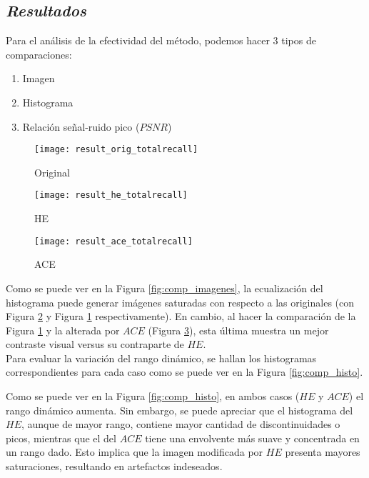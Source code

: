 \subsection{\emph{Resultados}}

Para el análisis de la efectividad del método, podemos hacer 3 tipos de
comparaciones:
\begin{enumerate}
	\item Imagen
	\item Histograma
	\item Relación señal-ruido pico ($PSNR$)
\end{enumerate}

\begin{figure*}%
	\centering
		\begin{subfigure}{1.0\columnwidth}
		\texttt{[image: result\_orig\_totalrecall]}%
		\caption{Original}%
		\label{subfig:original}%
	\end{subfigure}\hfill%
	\begin{subfigure}{1.0\columnwidth}
		\texttt{[image: result\_he\_totalrecall]}%
		\caption{HE}%
		\label{subfig:he}%
	\end{subfigure}\hfill%
	\begin{subfigure}{1.0\columnwidth}
		\texttt{[image: result\_ace\_totalrecall]}%
		\caption{ACE}%
		\label{subfig:ace}%
	\end{subfigure}%
	\caption{Comparación de resultados para la imagen de prueba \emph{Total Recall}.}
	\label{fig:comp_imagenes}
\end{figure*}

Como se puede ver en la Figura \ref{fig:comp_imagenes}, la ecualización del
histograma puede generar imágenes saturadas con respecto a las originales
(con Figura \ref{subfig:he} y Figura \ref{subfig:original} respectivamente). En
cambio, al hacer la comparación de la Figura \ref{subfig:original} y la alterada
por $ACE$ (Figura \ref{subfig:ace}), esta última muestra un mejor contraste
visual versus su contraparte de $HE$.\\

Para evaluar la variación del rango dinámico, se hallan los histogramas
correspondientes para cada caso como se puede ver en la Figura
\ref{fig:comp_histo}.


Como se puede ver en la Figura \ref{fig:comp_histo}, en ambos casos ($HE$ y
$ACE$) el rango dinámico aumenta. Sin embargo, se puede apreciar que el
histograma del $HE$, aunque de  mayor rango, contiene mayor cantidad de
discontinuidades o picos, mientras que el del $ACE$ tiene una envolvente más
suave y concentrada en un rango dado. Esto implica que la imagen modificada por
$HE$ presenta mayores saturaciones, resultando en artefactos indeseados.

